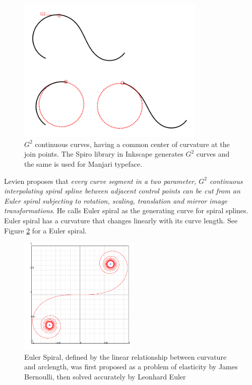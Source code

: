 \documentclass[11pt,twoside,a4paper,parskip=half]{scrartcl}
\begin{document}
\begin{figure}[h!]
	\includegraphics[width=0.8\textwidth]{images/g2.png}
	\caption{$G^2$ continuous curves, having a common center of curvature at the join points. The Spiro library in Inkscape generates $G^2$ curves and the same is used for Manjari typeface.}
	\label{g2}
\end{figure}

Levien proposes that \textit{every curve segment in a two parameter,  $G^2$ continuous interpolating spiral spline between adjacent control points can be cut from an Euler spiral subjecting to rotation, scaling, translation and mirror image transformations}. He calls Euler spiral as the generating curve for spiral splines. Euler spiral has a curvature that changes linearly with its curve length. See Figure \ref{eulerspiral} for a Euler spiral.


\begin{figure}
	\includegraphics[width=0.5\textwidth]{images/Euler_spiral.png}
	\caption{Euler Spiral, defined by the linear relationship between curvature and arclength, was first proposed as a problem of elasticity by James Bernoulli, then solved accurately by Leonhard Euler}
	\label{eulerspiral}
\end{figure}
\end{document}
